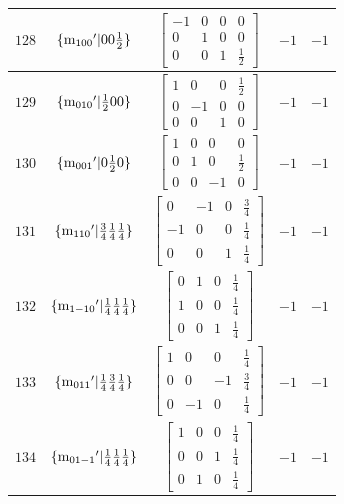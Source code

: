 \documentclass[fleqn,8pt]{jsarticle}
\begin{document}
\begin{longtable}{ccccc}
$ 128 $ & $ \{{\rm m}_{100}{}'|0 0 \frac{1}{2}\} $ & $ \begin{bmatrix} -1 & 0 & 0 & 0 \\ 0 & 1 & 0 & 0 \\ 0 & 0 & 1 & \frac{1}{2} \end{bmatrix} $ & $ -1 $ & $ -1 $ \\ \hline
$ 129 $ & $ \{{\rm m}_{010}{}'|\frac{1}{2} 0 0\} $ & $ \begin{bmatrix} 1 & 0 & 0 & \frac{1}{2} \\ 0 & -1 & 0 & 0 \\ 0 & 0 & 1 & 0 \end{bmatrix} $ & $ -1 $ & $ -1 $ \\ \hline
$ 130 $ & $ \{{\rm m}_{001}{}'|0 \frac{1}{2} 0\} $ & $ \begin{bmatrix} 1 & 0 & 0 & 0 \\ 0 & 1 & 0 & \frac{1}{2} \\ 0 & 0 & -1 & 0 \end{bmatrix} $ & $ -1 $ & $ -1 $ \\ \hline
$ 131 $ & $ \{{\rm m}_{110}{}'|\frac{3}{4} \frac{1}{4} \frac{1}{4}\} $ & $ \begin{bmatrix} 0 & -1 & 0 & \frac{3}{4} \\ -1 & 0 & 0 & \frac{1}{4} \\ 0 & 0 & 1 & \frac{1}{4} \end{bmatrix} $ & $ -1 $ & $ -1 $ \\ \hline
$ 132 $ & $ \{{\rm m}_{1-10}{}'|\frac{1}{4} \frac{1}{4} \frac{1}{4}\} $ & $ \begin{bmatrix} 0 & 1 & 0 & \frac{1}{4} \\ 1 & 0 & 0 & \frac{1}{4} \\ 0 & 0 & 1 & \frac{1}{4} \end{bmatrix} $ & $ -1 $ & $ -1 $ \\ \hline
$ 133 $ & $ \{{\rm m}_{011}{}'|\frac{1}{4} \frac{3}{4} \frac{1}{4}\} $ & $ \begin{bmatrix} 1 & 0 & 0 & \frac{1}{4} \\ 0 & 0 & -1 & \frac{3}{4} \\ 0 & -1 & 0 & \frac{1}{4} \end{bmatrix} $ & $ -1 $ & $ -1 $ \\ \hline
$ 134 $ & $ \{{\rm m}_{01-1}{}'|\frac{1}{4} \frac{1}{4} \frac{1}{4}\} $ & $ \begin{bmatrix} 1 & 0 & 0 & \frac{1}{4} \\ 0 & 0 & 1 & \frac{1}{4} \\ 0 & 1 & 0 & \frac{1}{4} \end{bmatrix} $ & $ -1 $ & $ -1 $ \\ \hline

\end{longtable}
\end{document}
